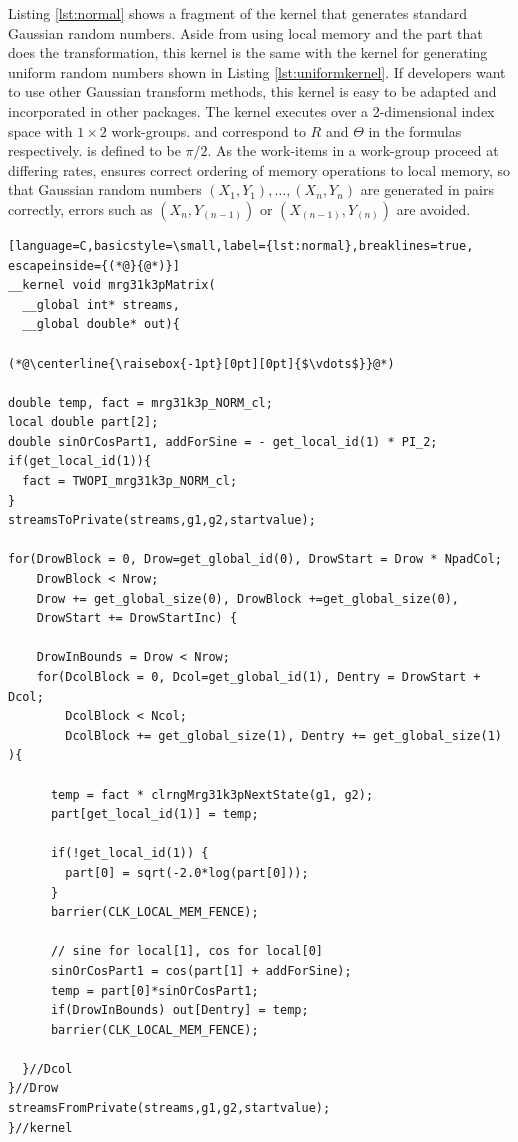 \documentclass[article,nojss]{jss}\usepackage[]{graphicx}\usepackage[]{color}
\begin{document}
Listing \ref{lst:normal} shows a fragment of the kernel that generates standard Gaussian random numbers. Aside from using local memory and the part that does the transformation, this kernel is the same with the kernel for generating uniform random numbers shown in Listing \ref{lst:uniformkernel}. If developers want to use other Gaussian transform methods, this kernel is easy to be adapted and incorporated in other  packages. The kernel executes over a 2-dimensional index space with $1 \times 2$ work-groups.  and  correspond to $R$ and $\Theta$ in the formulas respectively.  is defined to be $\pi/2$. As the work-items in a work-group proceed at differing rates,  ensures correct ordering of memory operations to local memory, so that Gaussian random numbers $(X_1,Y_1), \dots, (X_n,Y_n)$ are generated in pairs correctly, errors such as $(X_n, Y_{(n-1)})$ or $(X_{(n-1)}, Y_{(n)})$ are avoided.
%
\begin{framed}
\begin{lstlisting}[language=C,basicstyle=\small,label={lst:normal},breaklines=true, escapeinside={(*@}{@*)}]
__kernel void mrg31k3pMatrix(
  __global int* streams,
  __global double* out){

(*@\centerline{\raisebox{-1pt}[0pt][0pt]{$\vdots$}}@*)

double temp, fact = mrg31k3p_NORM_cl;
local double part[2];
double sinOrCosPart1, addForSine = - get_local_id(1) * PI_2;
if(get_local_id(1)){
  fact = TWOPI_mrg31k3p_NORM_cl;
}
streamsToPrivate(streams,g1,g2,startvalue);

for(DrowBlock = 0, Drow=get_global_id(0), DrowStart = Drow * NpadCol;
    DrowBlock < Nrow;
    Drow += get_global_size(0), DrowBlock +=get_global_size(0), 
    DrowStart += DrowStartInc) {
    
    DrowInBounds = Drow < Nrow;
    for(DcolBlock = 0, Dcol=get_global_id(1), Dentry = DrowStart + Dcol;
        DcolBlock < Ncol;
        DcolBlock += get_global_size(1), Dentry += get_global_size(1) ){
        
      temp = fact * clrngMrg31k3pNextState(g1, g2);
      part[get_local_id(1)] = temp;
      
      if(!get_local_id(1)) {
        part[0] = sqrt(-2.0*log(part[0]));
      }
      barrier(CLK_LOCAL_MEM_FENCE);
      
      // sine for local[1], cos for local[0]
      sinOrCosPart1 = cos(part[1] + addForSine);
      temp = part[0]*sinOrCosPart1;
      if(DrowInBounds) out[Dentry] = temp;
      barrier(CLK_LOCAL_MEM_FENCE);
      
  }//Dcol
}//Drow
streamsFromPrivate(streams,g1,g2,startvalue);
}//kernel
\end{lstlisting}
\end{framed}
\end{document}
